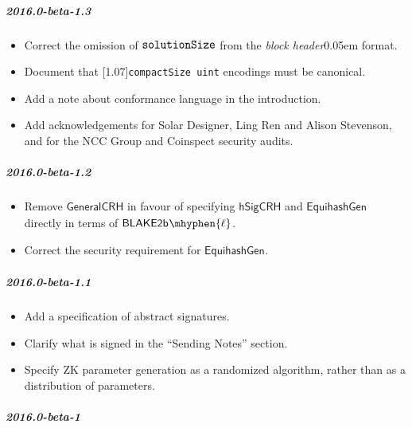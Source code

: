 \documentclass{article}
\let\oldtexttt\texttt
\let\oldmathtt\mathtt
\renewcommand{\texttt}[1]{\scalebox{1.02}[1.07]{\oldtexttt{#1}}}
\renewcommand{\mathtt}[1]{\scalebox{1.02}[1.07]{$\oldmathtt{#1}$}}
\newcommand{\introlist}{\needspace{15ex}}
\numberwithin{theorem}{subsection}
\newcommand{\term}[1]{\textsl{#1}\kern 0.05em\xspace}
\newcommand{\blockHeader}{\term{block header}}
\newcommand{\hSigCRH}{\mathsf{hSigCRH}}
\newcommand{\EquihashGen}[1]{\mathsf{EquihashGen}_{#1}}
\newcommand{\BlakeTwob}[1]{\mathsf{BLAKE2b\kern 0.05em\mhyphen{#1}}}
\newcommand{\type}[1]{\texttt{#1}}
\newcommand{\compactSize}{\type{compactSize uint}}
\newcommand{\solutionSize}{\mathtt{solutionSize}}
\begin{document}
\introlist
\subparagraph{2016.0-beta-1.3}

\begin{itemize}
    \item Correct the omission of $\solutionSize$ from the \blockHeader format.
    \item Document that \compactSize{} encodings must be canonical.
    \item Add a note about conformance language in the introduction.
    \item Add acknowledgements for Solar Designer, Ling Ren and Alison Stevenson,
          and for the NCC Group and Coinspect security audits.
\end{itemize}

\introlist
\subparagraph{2016.0-beta-1.2}

\begin{itemize}
    \item Remove $\mathsf{GeneralCRH}$ in favour of specifying $\hSigCRH$ and
          $\EquihashGen{}$ directly in terms of $\BlakeTwob{\ell}$.
    \item Correct the security requirement for $\EquihashGen{}$.
\end{itemize}

\introlist
\subparagraph{2016.0-beta-1.1}

\begin{itemize}
    \item Add a specification of abstract signatures.
    \item Clarify what is signed in the ``Sending Notes'' section.
    \item Specify ZK parameter generation as a randomized algorithm, rather
          than as a distribution of parameters.
\end{itemize}

\introlist
\subparagraph{2016.0-beta-1}
\end{document}
